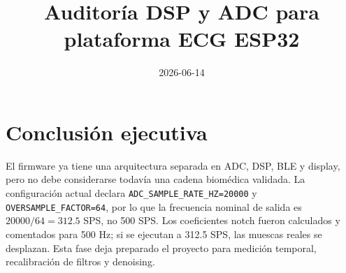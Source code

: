 \documentclass[11pt]{article}
\title{Auditoría DSP y ADC para plataforma ECG ESP32}
\date{2026-06-14}
\begin{document}
\maketitle
\section{Conclusión ejecutiva}
El firmware ya tiene una arquitectura separada en ADC, DSP, BLE y display, pero no debe considerarse todavía una cadena biomédica validada. La configuración actual declara \texttt{ADC\_SAMPLE\_RATE\_HZ=20000} y \texttt{OVERSAMPLE\_FACTOR=64}, por lo que la frecuencia nominal de salida es $20000/64=312.5$ SPS, no 500 SPS. Los coeficientes notch fueron calculados y comentados para 500 Hz; si se ejecutan a 312.5 SPS, las muescas reales se desplazan. Esta fase deja preparado el proyecto para medición temporal, recalibración de filtros y denoising.
\end{document}
